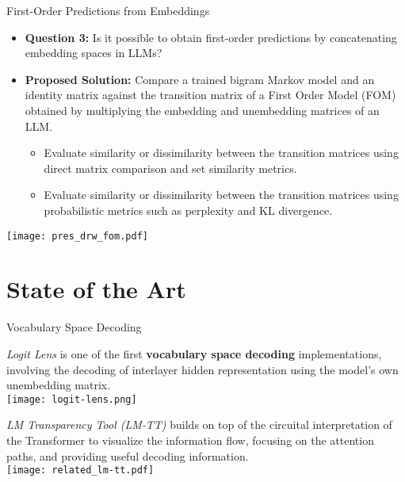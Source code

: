 \documentclass[aspectratio=169, 12pt, compress]{beamer}
\begin{document}
    \begin{frame}{First-Order Predictions from Embeddings}
        \begin{minipage}{0.8\textwidth}
            \begin{itemize}[<+|visible@+->]
                \item<1-1> \textbf{Question 3:} Is it possible to obtain first-order predictions by concatenating embedding spaces in LLMs?
                \item<2-3> \textbf{Proposed Solution:} Compare a trained bigram Markov model and an identity matrix against the transition matrix of a First Order Model (FOM) obtained by multiplying the embedding and unembedding matrices of an LLM.
                \begin{itemize}[<+|visible@+->]
                    \item<3-3> Evaluate similarity or dissimilarity between the transition matrices using direct matrix comparison and set similarity metrics.
                    \item<3-3> Evaluate similarity or dissimilarity between the transition matrices using probabilistic metrics such as perplexity and KL divergence.
                \end{itemize}
            \end{itemize}
        \end{minipage}%
        \begin{minipage}{0.2\textwidth}
            \centering%
            \texttt{[image: pres\_drw\_fom.pdf]}%
        \end{minipage}%
    \end{frame}

    \section{State of the Art}

    \begin{frame}{Vocabulary Space Decoding}
        \begin{minipage}{0.48\textwidth}
            \centering
            {\justifying\footnotesize \emph{Logit Lens} is one of the first \textbf{vocabulary space decoding} implementations, involving the decoding of interlayer hidden representation using the model's own unembedding matrix. \\[2pt]}
            \texttt{[image: logit-lens.png]}
        \end{minipage}%
        \hfill%
        \begin{minipage}{0.48\textwidth}
            \centering
            {\justifying\footnotesize \emph{LM Transparency Tool (LM-TT)} builds on top of the circuital interpretation of the Transformer to visualize the information flow, focusing on the attention paths, and providing useful decoding information. \\[2pt]}
            \texttt{[image: related\_lm-tt.pdf]}
        \end{minipage}
    \end{frame}
\end{document}
